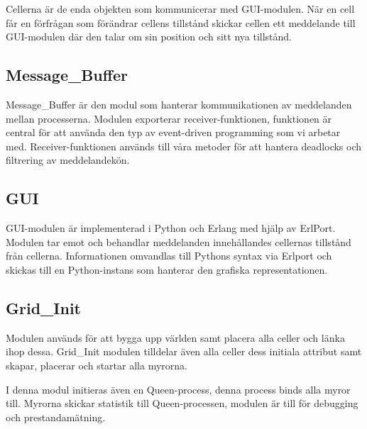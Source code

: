 Cellerna är de enda objekten som kommunicerar med GUI-modulen. När en cell får en förfrågan som förändrar cellens tillstånd skickar cellen ett meddelande till GUI-modulen där den talar om sin position och sitt nya tillstånd. 

\subsection{Message\_Buffer}

Message\_Buffer är den modul som hanterar kommunikationen av meddelanden mellan processerna. Modulen exporterar receiver-funktionen, funktionen är central för att använda den typ av event-driven programming som vi arbetar med. Receiver-funktionen används till våra metoder för att hantera deadlocks och filtrering av meddelandekön.

\subsection{GUI}

GUI-modulen är implementerad i Python och Erlang med hjälp av ErlPort. Modulen tar emot och behandlar meddelanden innehållandes cellernas tillstånd från cellerna. 
Informationen omvandlas till Pythons syntax via Erlport och skickas till en Python-instans som hanterar den grafiska representationen.

\subsection{Grid\_Init}

Modulen används för att bygga upp världen samt placera alla celler och länka ihop dessa. Grid\_Init modulen tilldelar även alla celler dess initiala attribut samt skapar, placerar och startar alla myrorna.

I denna modul initieras även en Queen-process, denna process binds alla myror till. Myrorna skickar statistik till Queen-processen, modulen är till för debugging och prestandamätning. 
